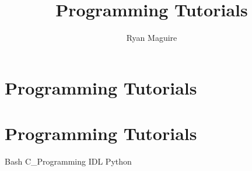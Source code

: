\documentclass[crop=false,class=book,oneside]{standalone}
\begin{document}
    \newif\ifcoursesprogrammingtutorials
    \ifx\ifcoursesother\undefined
        \title{Programming Tutorials}
        \author{Ryan Maguire}
        \date{\vspace{-5ex}}
        \maketitle
        \tableofcontents
        \clearpage
        \chapter*{Programming Tutorials}
        \setcounter{chapter}{1}
    \else
        \chapter{Programming Tutorials}
    \fi
    {Bash}
    {C_Programming}
    {IDL}
    {Python}
\end{document}
